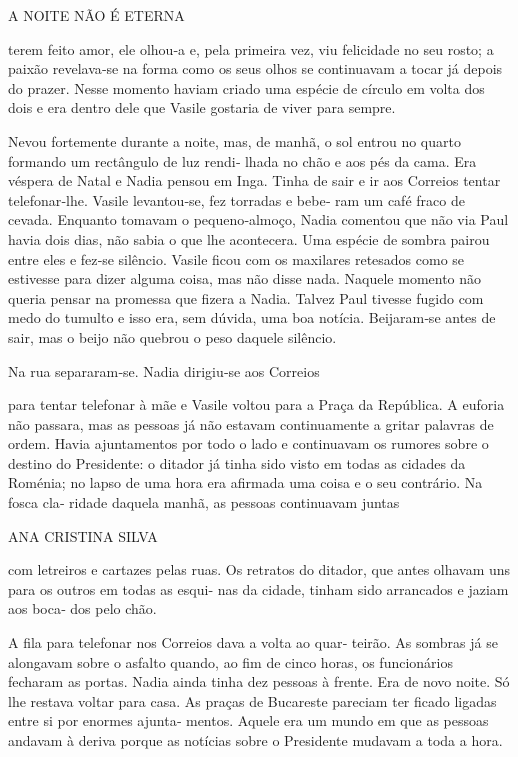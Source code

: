 A NOITE NÃO É ETERNA

terem feito amor, ele olhou‑a e, pela primeira vez, viu felicidade no
seu rosto; a paixão revelava‑se na forma como os seus olhos se
continuavam a tocar já depois do prazer. Nesse momento haviam criado uma
espécie de círculo em volta dos dois e era dentro dele que Vasile
gostaria de viver para sempre.

Nevou fortemente durante a noite, mas, de manhã, o sol entrou no quarto
formando um rectângulo de luz rendi‑ lhada no chão e aos pés da cama.
Era véspera de Natal e Nadia pensou em Inga. Tinha de sair e ir aos
Correios tentar telefonar‑lhe. Vasile levantou‑se, fez torradas e bebe‑
ram um café fraco de cevada. Enquanto tomavam o pequeno‑almoço, Nadia
comentou que não via Paul havia dois dias, não sabia o que lhe
acontecera. Uma espécie de sombra pairou entre eles e fez‑se silêncio.
Vasile ficou com os maxilares retesados como se estivesse para dizer
alguma coisa, mas não disse nada. Naquele momento não queria pensar na
promessa que fizera a Nadia. Talvez Paul tivesse fugido com medo do
tumulto e isso era, sem dúvida, uma boa notícia. Beijaram‑se antes de
sair, mas o beijo não quebrou o peso daquele silêncio.

Na rua separaram‑se. Nadia dirigiu‑se aos Correios

para tentar telefonar à mãe e Vasile voltou para a Praça da República. A
euforia não passara, mas as pessoas já não estavam continuamente a
gritar palavras de ordem. Havia ajuntamentos por todo o lado e
continuavam os rumores sobre o destino do Presidente: o ditador já tinha
sido visto em todas as cidades da Roménia; no lapso de uma hora era
afirmada uma coisa e o seu contrário. Na fosca cla‑ ridade daquela
manhã, as pessoas continuavam juntas

ANA CRISTINA SILVA

com letreiros e cartazes pelas ruas. Os retratos do ditador, que antes
olhavam uns para os outros em todas as esqui‑ nas da cidade, tinham sido
arrancados e jaziam aos boca‑ dos pelo chão.

A fila para telefonar nos Correios dava a volta ao quar‑ teirão. As
sombras já se alongavam sobre o asfalto quando, ao fim de cinco horas,
os funcionários fecharam as portas. Nadia ainda tinha dez pessoas à
frente. Era de novo noite. Só lhe restava voltar para casa. As praças de
Bucareste pareciam ter ficado ligadas entre si por enormes ajunta‑
mentos. Aquele era um mundo em que as pessoas andavam à deriva porque as
notícias sobre o Presidente mudavam a toda a hora.

